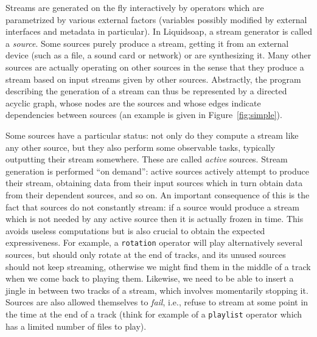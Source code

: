 \documentclass{llncs}
\newcommand{\liquidsoap}{Liquidsoap}
\newcommand{\ie}{{i.e.},}
\begin{document}
Streams are generated on the fly interactively by operators which are parametrized by various 
external factors (variables possibly modified by external interfaces and metadata in particular).
In \liquidsoap{}, a stream generator is called a \emph{source}. Some sources
purely produce a stream, getting it from an external device (such as a file, a
sound card or network) or are synthesizing it. Many other sources are actually
operating on other sources in the sense that they produce a stream based on input
streams given by other sources. Abstractly, the program describing the
generation of a stream can thus be represented by a directed acyclic graph,
whose nodes are the sources and whose edges indicate dependencies between
sources (an example is given in Figure~\ref{fig:simple}).


Some sources have a particular status: not only do they compute a stream like any
other source, but they also perform some observable tasks, typically outputting
their stream somewhere. These are called \emph{active} sources. Stream
generation is performed ``on demand'': active sources actively attempt to
produce their stream, obtaining data from their input sources which in turn
obtain data from their dependent sources, and so on. An important consequence of
this is the fact that sources do not constantly stream: if a source would
produce a stream which is not needed by any active source then it is actually
frozen in time. This avoids useless computations but is also crucial to obtain
the expected expressiveness. For example, a \texttt{rotation} operator will play
alternatively several sources, but should only rotate at the end of tracks, and
its unused sources should not keep streaming, otherwise we might find them in
the middle of a track when we come back to playing them. Likewise, we need to be
able to insert a jingle in between two tracks of a stream, which involves
momentarily stopping it. Sources are also allowed themselves to \emph{fail},
\ie{} refuse to stream at some point in the time at the end of a track (think
for example of a \texttt{playlist} operator which has a limited number of files
to play).
\end{document}
